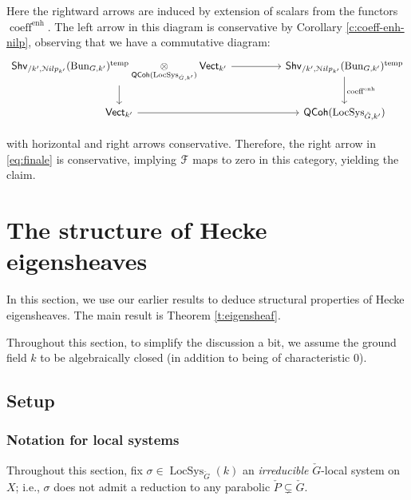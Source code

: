 \documentclass[reqno,11pt]{amsart}
\numberwithin{equation}{subsection}
\theoremstyle{remark}
\newcommand{\sF}{{\EuScript F}}
\newcommand{\sN}{{\EuScript N}}
\newcommand{\on}{\operatorname}
\newcommand{\Vect}{\mathsf{Vect}}
\newcommand{\Bun}{\on{Bun}}
\newcommand{\LocSys}{\on{LocSys}}
\newcommand{\QCoh}{\mathsf{QCoh}}
\newcommand{\coeff}{\on{coeff}}
\newcommand{\enh}{\on{enh}}
\newcommand{\Shv}{\mathsf{Shv}}
\newcommand{\temp}{\on{temp}}
\newcommand{\Nilp}{\sN ilp}
\begin{document}
\noindent Here the rightward arrows are induced by extension of scalars 
from the functors $\coeff^{\enh}$.
The left arrow in this diagram is conservative by Corollary \ref{c:coeff-enh-nilp},
observing that we have a commutative diagram:
%
\[
\begin{tikzcd}
\Shv_{/k^{\prime},\Nilp_{k^{\prime}}}(\Bun_{G,k^{\prime}})^{\temp}
\underset{\QCoh(\LocSys_{\check{G},k^{\prime}})}{\otimes} \Vect_{k^{\prime}}
\arrow[d] 
\arrow[rr]
&&
\Shv_{/k^{\prime},\Nilp_{k^{\prime}}}(\Bun_{G,k^{\prime}})^{\temp}
\arrow[d,"\coeff^{\enh}"]
\\
\Vect_{k^{\prime}}
\arrow[rr]
&&
\QCoh(\LocSys_{\check{G},k^{\prime}})
\end{tikzcd}
\]

\noindent with horizontal and right arrows conservative.
Therefore, the right arrow in \eqref{eq:finale} is conservative,
implying $\sF$ maps to zero in this category, yielding the claim.


\section{The structure of Hecke eigensheaves}\label{s:eigensheaves}

In this section, we use our earlier results to deduce structural
properties of Hecke eigensheaves. The main result is Theorem \ref{t:eigensheaf}.

Throughout this section, to simplify the discussion a bit,
we assume the ground field $k$ to be 
algebraically closed (in addition to being of characteristic $0$).

\subsection{Setup}

\subsubsection{Notation for local systems}

Throughout this section, fix 
$\sigma \in \LocSys_{\check{G}}(k)$ an \emph{irreducible} $\check{G}$-local system
on $X$; i.e., $\sigma$ does not admit a reduction to any parabolic 
$\check{P} \subsetneq \check{G}$.

\subsubsection{}\label{sss:very-irred}
\end{document}
